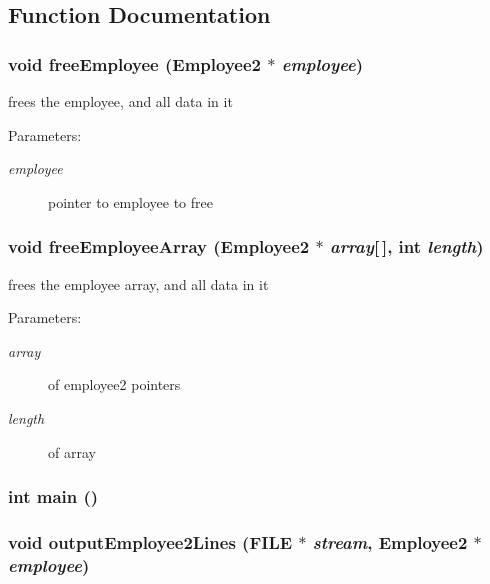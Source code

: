 \subsection{Function Documentation}
\subsubsection{\setlength{\rightskip}{0pt plus 5cm}void free\-Employee (\bf{Employee2} $\ast$ {\em employee})}\label{part3_8c_281efe844097b8093f78ae38a89eb9cc}


frees the employee, and all data in it \begin{Desc}
\item[Parameters:]
\begin{description}
\item[{\em employee}]pointer to employee to free \end{description}
\end{Desc}
\subsubsection{\setlength{\rightskip}{0pt plus 5cm}void free\-Employee\-Array (\bf{Employee2} $\ast$ {\em array}[$\,$], int {\em length})}\label{part3_8c_d8ca09b05dde37253b6d3b2f70e740fb}


frees the employee array, and all data in it \begin{Desc}
\item[Parameters:]
\begin{description}
\item[{\em array}]of employee2 pointers \item[{\em length}]of array \end{description}
\end{Desc}
\subsubsection{\setlength{\rightskip}{0pt plus 5cm}int main ()}\label{part3_8c_e66f6b31b5ad750f1fe042a706a4e3d4}


\subsubsection{\setlength{\rightskip}{0pt plus 5cm}void output\-Employee2Lines (FILE $\ast$ {\em stream}, \bf{Employee2} $\ast$ {\em employee})}\label{part3_8c_a4b7fa5d06b43755ad9541e6b381a090}


